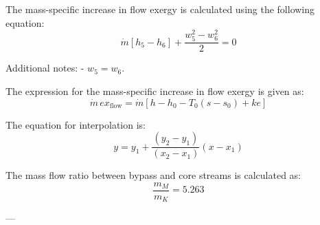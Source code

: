 The mass-specific increase in flow exergy is calculated using the following equation:  
\[
\dot{m} \left[ h_5 - h_6 \right] + \frac{w_5^2 - w_6^2}{2} = 0
\]  

Additional notes:  
- \( w_5 = w_6 \).

The expression for the mass-specific increase in flow exergy is given as:  
\[
\dot{m} \, ex_{\text{flow}} = \dot{m} \left[ h - h_0 - T_0 \left( s - s_0 \right) + ke \right]
\]  

The equation for interpolation is:  
\[
y = y_1 + \frac{\left( y_2 - y_1 \right)}{\left( x_2 - x_1 \right)} \left( x - x_1 \right)
\]  

The mass flow ratio between bypass and core streams is calculated as:  
\[
\frac{m_M}{m_K} = 5.263
\]  

---